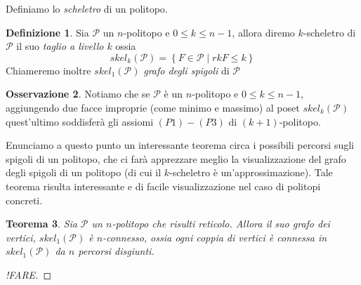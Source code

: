 \documentclass[a4paper,12pt]{report}
\newcommand{\p}{\mathcal{P}}
\theoremstyle{plain}
\newtheorem{teo}{Teorema}[chapter]
\theoremstyle{definition}
\newtheorem{defin}[teo]{Definizione}
\newtheorem{oss}[teo]{Osservazione}
\begin{document}
Definiamo lo \emph{scheletro} di un politopo.
\begin{defin}
Sia $\p$ un $n$-politopo e $0\leq k\leq n-1$, allora diremo $k$-scheletro di $\p$ il suo \emph{taglio a livello $k$} ossia
\begin{equation*}
skel_k(\p)=\left\{F\in\p\mid rkF\leq k\right\}
\end{equation*}
Chiameremo inoltre $skel_1(\p)$ \emph{grafo degli spigoli} di $\p$
\end{defin}

\begin{oss}
Notiamo che se $\p$ \`e un $n$-politopo e $0\leq k\leq n-1$, aggiungendo due facce improprie (come minimo e massimo) al poset $skel_k(\p)$ quest'ultimo
soddisfer\`a gli assiomi $(P1)-(P3)$ di $(k+1)$-politopo.
\end{oss}

Enunciamo a questo punto un interessante teorema circa i possibili percorsi sugli spigoli di un politopo, che ci far\`a apprezzare meglio
la visualizzazione del grafo degli spigoli di un politopo (di cui il $k$-scheletro \`e un'approssimazione).
Tale teorema risulta interessante e di facile visualizzazione nel caso di politopi concreti.
\begin{teo}
Sia $\p$ un $n$-politopo che risulti reticolo. Allora il suo grafo dei vertici, $skel_1(\p)$ \`e $n$-connesso, ossia ogni coppia di vertici
 \`e connessa in $skel_1(\p)$ da $n$ percorsi \emph{disgiunti}.
\end{teo}
\begin{proof}
[!FARE]
\end{proof}
\end{document}
